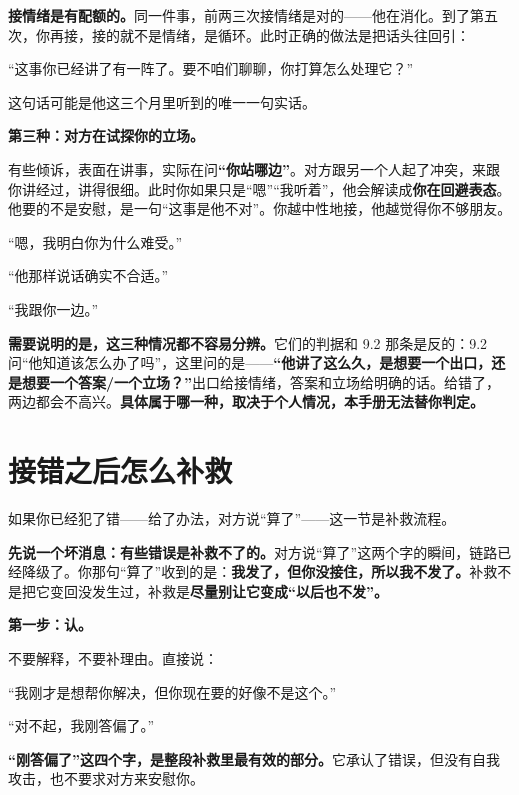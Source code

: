 \textbf{接情绪是有配额的。}同一件事，前两三次接情绪是对的——他在消化。到了第五次，你再接，接的就不是情绪，是循环。此时正确的做法是把话头往回引：

\begin{mdquote}
“这事你已经讲了有一阵了。要不咱们聊聊，你打算怎么处理它？”
\end{mdquote}

这句话可能是他这三个月里听到的唯一一句实话。

\textbf{第三种：对方在试探你的立场。}

有些倾诉，表面在讲事，实际在问\textbf{“你站哪边”}。对方跟另一个人起了冲突，来跟你讲经过，讲得很细。此时你如果只是“嗯”“我听着”，他会解读成\textbf{你在回避表态}。他要的不是安慰，是一句“这事是他不对”。你越中性地接，他越觉得你不够朋友。

\begin{mdquote}
“嗯，我明白你为什么难受。”

“他那样说话确实不合适。”

“我跟你一边。”
\end{mdquote}

\textbf{需要说明的是，这三种情况都不容易分辨。}它们的判据和 9.2 那条是反的：9.2 问“他知道该怎么办了吗”，这里问的是——\textbf{“他讲了这么久，是想要一个出口，还是想要一个答案/一个立场？”}出口给接情绪，答案和立场给明确的话。给错了，两边都会不高兴。\textbf{具体属于哪一种，取决于个人情况，本手册无法替你判定。}

\section{接错之后怎么补救}

如果你已经犯了错——给了办法，对方说“算了”——这一节是补救流程。

\textbf{先说一个坏消息：有些错误是补救不了的。}对方说“算了”这两个字的瞬间，链路已经降级了。你那句“算了”收到的是：\textbf{我发了，但你没接住，所以我不发了。}补救不是把它变回没发生过，补救是\textbf{尽量别让它变成“以后也不发”。}

\textbf{第一步：认。}

不要解释，不要补理由。直接说：

\begin{mdquote}
“我刚才是想帮你解决，但你现在要的好像不是这个。”

“对不起，我刚答偏了。”
\end{mdquote}

\textbf{“刚答偏了”这四个字，是整段补救里最有效的部分。}它承认了错误，但没有自我攻击，也不要求对方来安慰你。

